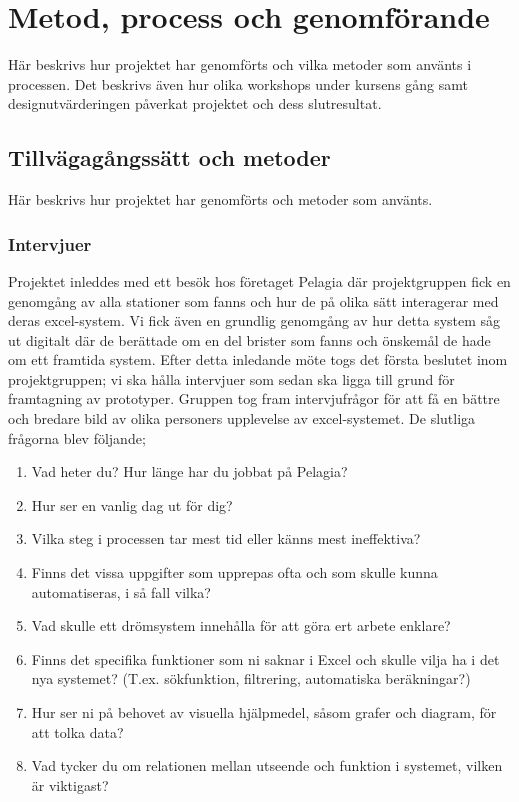 \section{Metod, process och genomförande}
Här beskrivs hur projektet har genomförts och vilka metoder som använts i processen. Det beskrivs även hur olika workshops under kursens gång samt designutvärderingen påverkat projektet och dess slutresultat. 

\subsection{Tillvägagångssätt och metoder}
Här beskrivs hur projektet har genomförts och metoder som använts.

\subsubsection{Intervjuer}
Projektet inleddes med ett besök hos företaget Pelagia där projektgruppen fick en genomgång av alla stationer som fanns och hur de på olika sätt interagerar med deras excel-system. Vi fick även en grundlig genomgång av hur detta system såg ut digitalt där de berättade om en del brister som fanns och önskemål de hade om ett framtida system. Efter detta inledande möte togs det första beslutet inom projektgruppen; vi ska hålla intervjuer som sedan ska ligga till grund för framtagning av prototyper. Gruppen tog fram intervjufrågor för att få en bättre och bredare bild av olika personers upplevelse av excel-systemet. De slutliga frågorna blev följande; 
\\
\begin{enumerate}
    \item Vad heter du? Hur länge har du jobbat på Pelagia?
    \item Hur ser en vanlig dag ut för dig?
    \item Vilka steg i processen tar mest tid eller känns mest ineffektiva? 
    \item Finns det vissa uppgifter som upprepas ofta och som skulle kunna automatiseras, i så fall vilka?
    \item Vad skulle ett drömsystem innehålla för att göra ert arbete enklare?
    \item Finns det specifika funktioner som ni saknar i Excel och skulle vilja ha i det nya systemet? (T.ex. sökfunktion, filtrering, automatiska beräkningar?)
    \item Hur ser ni på behovet av visuella hjälpmedel, såsom grafer och diagram, för att tolka data?
    \item Vad tycker du om relationen mellan utseende och funktion i systemet, vilken är viktigast?
\\
\end{enumerate}

